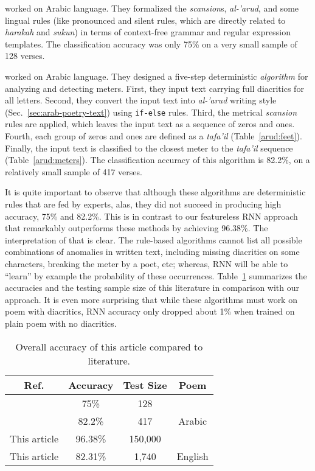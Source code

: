 \documentclass[journal,10pt,twocolumns,letter]{IEEEtran}
\begin{document}
\cite{Alnagdawi2013FindingArabicPoemMeter} worked on Arabic language. They formalized the
\textit{scansion}s, \textit{al-'arud}, and some lingual rules (like pronounced and silent rules,
which are directly related to \textit{harakah} and \textit{sukun}) in terms of context-free grammar
and regular expression templates. The classification accuracy was only 75\% on a very small sample
of 128 verses.

\cite{Abuata2016RuleBasedAlgorithmFor} worked on Arabic language. They designed a five-step
deterministic \textit{algorithm} for analyzing and detecting meters. First, they input text carrying
full diacritics for all letters. Second, they convert the input text into \textit{al-'arud} writing
style (Sec.~\ref{sec:arab-poetry-text}) using \texttt{if-else} rules. Third, the metrical
\textit{scansion} rules are applied, which leaves the input text as a sequence of zeros and
ones. Fourth, each group of zeros and ones are defined as a \textit{tafa'il}
(Table~\ref{arud:feet}). Finally, the input text is classified to the closest meter to the
\textit{tafa'il} sequence (Table~\ref{arud:meters}). The classification accuracy of this algorithm
is 82.2\%, on a relatively small sample of 417 verses.

\bigskip

It is quite important to observe that although these algorithms are deterministic rules that are fed
by experts, alas, they did not succeed in producing high accuracy, 75\% and 82.2\%. This is in
contrast to our featureless RNN approach that remarkably outperforms these methods by achieving
96.38\%. The interpretation of that is clear. The rule-based algorithms cannot list all possible
combinations of anomalies in written text, including missing diacritics on some characters, breaking
the meter by a poet, etc; whereas, RNN will be able to ``learn'' by example the probability of these
occurrences. Table~\ref{tab:summ-results} summarizes the accuracies and the testing sample size of
this literature in comparison with our approach. It is even more surprising that while these
algorithms must work on poem with diacritics, RNN accuracy only dropped about 1\% when trained on
plain poem with no diacritics.

\begin{table}[!tb]
  \centering
  \begin{tabular}{c c c c}
    \toprule
    \textbf{Ref.}& \textbf{Accuracy}& \textbf{Test Size} & \textbf{Poem}\\
    \midrule
    \cite{Alnagdawi2013FindingArabicPoemMeter}   & 75\%     & 128     & \multirow{3}{*}{Arabic}\\
    \cite{Abuata2016RuleBasedAlgorithmFor}      & 82.2\%   & 417     & \\
    This article   & 96.38\%  & 150,000 & \\
    \midrule
    This article   & 82.31\%  &  1,740  & English\\
    \bottomrule
  \end{tabular}
  \caption{Overall accuracy of this article compared to literature.}\label{tab:summ-results}
\end{table}
\end{document}
